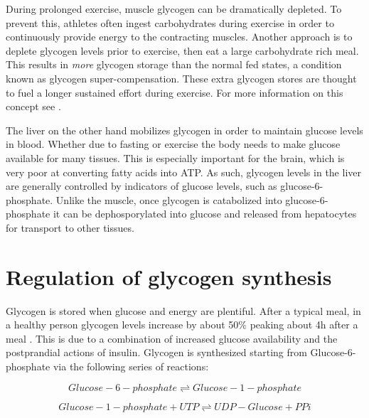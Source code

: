 \documentclass{tufte-handout}
\begin{document}
  During prolonged exercise, muscle glycogen can be dramatically depleted.  To prevent this, athletes often ingest carbohydrates during exercise in order to continuously provide energy to the contracting muscles.  Another approach is to deplete glycogen levels prior to exercise, then eat a large carbohydrate rich meal.  This results in \emph{more} glycogen storage than the normal fed states, a condition known as glycogen super-compensation.  These extra glycogen stores are thought to fuel a longer sustained effort during exercise.  For more information on this concept see \citet{Hawley1997}.  

  The liver on the other hand mobilizes glycogen in order to maintain glucose levels in blood.  Whether due to fasting or exercise the body needs to make glucose available for many tissues.  This is especially important for the brain, which is very poor at converting fatty acids into ATP.  As such, glycogen levels in the liver are generally controlled by indicators of glucose levels, such as glucose-6-phosphate.  Unlike the muscle, once glycogen is catabolized into glucose-6-phosphate it can be dephosporylated into glucose and released from hepatocytes for transport to other tissues.

\section{Regulation of glycogen synthesis}

Glycogen is stored when glucose and energy are plentiful.  After a typical meal, in a healthy person glycogen levels increase by about 50\% peaking about 4h after a meal \citep{Taylor1996a}.  This is due to a combination of increased glucose availability and the postprandial actions of insulin.  Glycogen is synthesized starting from Glucose-6-phosphate via the following series of reactions:

\begin{equation}
Glucose-6-phosphate \rightleftharpoons Glucose-1-phosphate
\end{equation}

\begin{equation}
Glucose-1-phosphate + UTP \rightleftharpoons UDP-Glucose + PPi
\end{equation}
\end{document}

